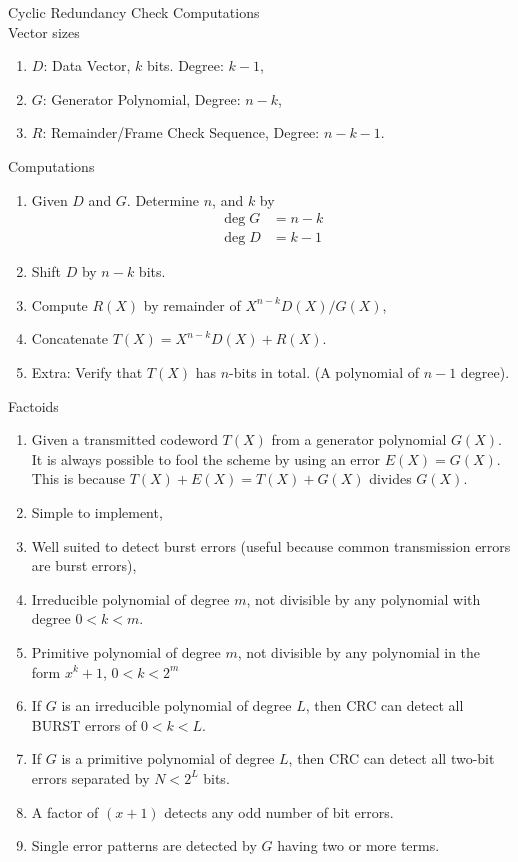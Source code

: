 \documentclass[../../main.tex]{subfiles}
\begin{document}
\begin{wtr} Cyclic Redundancy Check Computations\\[2ex]
    Vector sizes
    \begin{enumerate}
        \item $D$: Data Vector, $k$ bits. Degree: $k-1$,
        \item $G$: Generator Polynomial, Degree: $n-k$,
        \item $R$: Remainder/Frame Check Sequence, Degree: $n-k-1$.
    \end{enumerate}
    Computations
    \begin{enumerate}
        \item Given $D$ and $G$. Determine $n$, and $k$ by
        \begin{align}
            \deg{G} &=n-k\\
            \deg{D} &= k-1
        \end{align}
        \item Shift $D$ by $n-k$ bits.
        \item Compute $R(X)$ by remainder of $X^{n-k}D(X)/G(X)$,
        \item Concatenate $T(X) = X^{n-k}D(X) + R(X)$.
        \item Extra: Verify that $T(X)$ has $n$-bits in total. (A polynomial of $n-1$ degree).
    \end{enumerate}
    Factoids
    \begin{enumerate}
        \item Given a transmitted codeword $T(X)$ from a generator polynomial $G(X)$. It is always possible to fool the scheme by using an error $E(X) = G(X)$. This is because $T(X)+E(X) = T(X) + G(X)$ divides $G(X)$.
        \item Simple to implement,
        \item Well suited to detect burst errors (useful because common transmission errors are burst errors),
        \item Irreducible polynomial of degree $m$, not divisible by any polynomial with degree $0<k<m$.
        \item Primitive polynomial of degree $m$, not divisible by any polynomial in the form $x^k + 1$, $0<k<2^m$
        \item If $G$ is an irreducible polynomial of degree $L$, then CRC can detect all BURST errors of $0<k<L$.
        \item If $G$ is a primitive polynomial of degree $L$, then CRC can detect all two-bit errors separated by $N<2^L$ bits.
        \item A factor of $(x+1)$ detects any odd number of bit errors.
        \item Single error patterns are detected by $G$ having two or more terms.
    \end{enumerate}
\end{wtr}
\end{document}
